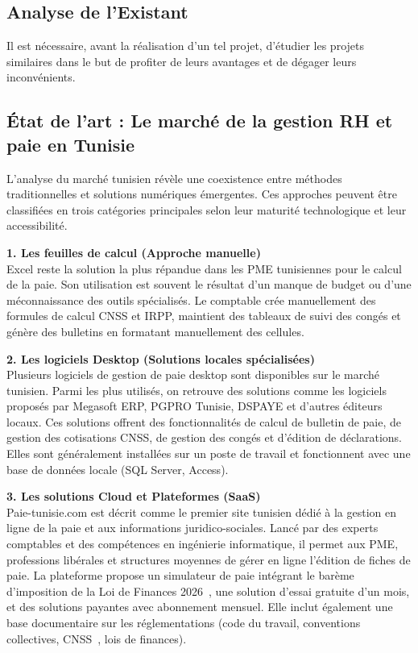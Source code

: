 \subsection{Analyse de l'Existant}
Il est nécessaire, avant la réalisation d'un tel projet, d'étudier les projets similaires dans le but de profiter de leurs avantages et de dégager leurs inconvénients.

\subsection{État de l'art : Le marché de la gestion RH et paie en Tunisie}

L'analyse du marché tunisien révèle une coexistence entre méthodes traditionnelles et solutions numériques émergentes. Ces approches peuvent être classifiées en trois catégories principales selon leur maturité technologique et leur accessibilité.

\vspace{0.4cm}

\noindent \textbf{1. Les feuilles de calcul (Approche manuelle)} \\
Excel reste la solution la plus répandue dans les PME tunisiennes pour le calcul de la paie.
Son utilisation est souvent le résultat d'un manque de budget ou d'une méconnaissance des
outils spécialisés. Le comptable crée manuellement des formules de calcul CNSS et IRPP,
maintient des tableaux de suivi des congés et génère des bulletins en formatant manuellement
des cellules.

\vspace{0.3cm}

\noindent \textbf{2. Les logiciels Desktop (Solutions locales spécialisées)} \\
Plusieurs logiciels de gestion de paie desktop sont disponibles sur le marché tunisien. Parmi
les plus utilisés, on retrouve des solutions comme les logiciels proposés par Megasoft ERP,
PGPRO Tunisie, DSPAYE et d'autres éditeurs locaux. Ces solutions offrent des
fonctionnalités de calcul de bulletin de paie, de gestion des cotisations CNSS, de gestion des
congés et d'édition de déclarations. Elles sont généralement installées sur un poste de travail
et fonctionnent avec une base de données locale (SQL Server, Access).

\vspace{0.3cm}

\noindent \textbf{3. Les solutions Cloud et Plateformes (SaaS)} \\
Paie-tunisie.com est décrit comme le premier site tunisien dédié à la gestion en ligne de la
paie et aux informations juridico-sociales. Lancé par des experts comptables et des
compétences en ingénierie informatique, il permet aux PME, professions libérales et
structures moyennes de gérer en ligne l'édition de fiches de paie. La plateforme propose un
simulateur de paie intégrant le barème d'imposition de la Loi de Finances 2026~\cite{loifinance},
une solution d'essai gratuite d'un mois, et des solutions payantes avec abonnement mensuel.
Elle inclut également une base documentaire sur les réglementations (code du travail,
conventions collectives, CNSS~\cite{cnss_reg}, lois de finances).

